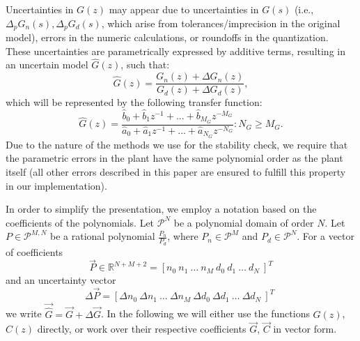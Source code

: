 \documentclass[final]{sig-alternate-05-2015}
\begin{document}
Uncertainties in $G(z)$ may appear due to uncertainties in $G(s)$ (i.e.,
$\Delta_p{G}_n(s),\Delta_p{G}_d(s)$, which arise from tolerances/imprecision
in the original model), errors in the numeric calculations, or roundoffs in
the quantization.  These uncertainties are parametrically expressed by
additive terms, resulting in an uncertain model $\hat{G}(z)$, such that:
%
\begin{equation}
\hat{G}(z)=\frac{G_n(z)+\Delta G_n(z)}{G_d(z)+\Delta G_d(z)},
\end{equation}
%
which will be represented by the following transfer function:
%
\begin{equation}
\hat{G}(z)=\frac{\hat{b}_{0}+\hat{b}_{1}z^{-1}+...+\hat{b}_{M_G}z^{-M_G}}{\hat{a}_{0}+\hat{a}_{1}z^{-1}+...+\hat{a}_{N_G}z^{-N_G}} : N_G \geq M_G .
\end{equation}
%
Due to the nature of the methods we use for the stability check, we require
that the parametric errors in the plant have the same polynomial order as
the plant itself (all other errors described in this paper are ensured to
fulfill this property in our implementation).

In order to simplify the presentation, we employ a notation based on the
coefficients of the polynomials.  Let $\mathcal{P}^{N}$ be a polynomial
domain of order $N$. Let $P \in \mathcal{P}^{M,N}$ be a rational polynomial
$\frac{P_n}{P_d}$, where $P_n \in \mathcal{P}^{M}$ and $P_d \in \mathcal{P}^{N}$.  
For a vector of coefficients
%
\begin{equation}
\vec{P} \in \mathbb{R}^{N+M+2}=[n_{0}\ n_{1}\ \hdots \ n_{M}\ d_{0}\ d_{1}\ \hdots\ d_{N}\ ]^T
\label{eq:coefficients}
\end{equation}
%
and an uncertainty vector 
%
\begin{equation}
\Delta{\vec{P}}=[\Delta{n}_{0}\ \Delta{n}_{1}\ \hdots \ \Delta{n}_{M}\ \Delta{d}_{0}\ \Delta{d}_{1}\ \hdots\ \Delta{d}_{N}\ ]^T \; 
\label{eq:delta_coefficients}
\end{equation}
%
we write $\vec{\hat{G}}=\vec{G}+\Delta{\vec{G}}$.  In the following we will
either use the functions $G(z)$, $C(z)$ directly, or work over their
respective coefficients $\vec{G}$, $\vec{C}$ in vector form.
\end{document}
